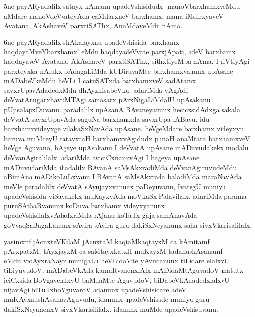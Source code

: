 \begin{artha}
5ne payARyadalilx satayx kAmanu upadeVshisidudx- manoVbarxhamxveMdu aMdare manoVdeVvateyAda caMdarxneV barxhamx, mana iMdirxyaveV Ayatana, AkAshaveV parxtiSAThx, AnaMdaveMdu nAma. 
\end{artha}

\begin{artha}
6ne payARyadalilx shAkalayxnu upadeVshisida barxhamx haqdayaMveYbarxhamx' eMdu haqdayadeVvate parxjApati, adeV barxhamx haqdayaveV Ayatana, AkAshaveV parxtiSAThx, sithxtiyeMba nAma. I riVtiyAgi parxteyxka nAlukx pAdagaLiMda kUDiruvaMte barxhamxvanunx upAsane mADabeVkeMdu heVLi I catuSATxda barxhamxveV sadAtamx savxrUpavAdadedxMdu dhAyxnisabeVku. adariMda vAgAdi deVvatAnugarxhavuMTAgi samasatx pArxNigaLiMdalU upAsakanu pUjisalapxDuvanu. paradalilx upAsanA BAvaneyanunx hecicxsidAdxga sakala deVvatA savxrUpavAda saguNa barxhamxda savxrUpa lABavu. idu barxhamxvideyxge vilakaSxNavAda upAsane. heVgeMdare barxhamx videyxyu baruva muMceyU tatavxtaH barxhamxvAgidudx punaH anaMtara barxhamxveV heVge Aguvano, hAgeye upAsakanu I deVvatA upAsane mADuvudakekx modalu deVvanAgiralilalx. adariMda aviciCxnanxvAgi I bageya upAsane mADuvudariMda ihadalilx BAvanA saMsAkxradiMda deVvanAgiruvudeMdu aBimAna mADikoLuLxvanu I BAvanA saMsAkxrada baladiMda maraNavAda meVle paradalilx deVvatA sAyujayxvanunx paDeyuvanu, IvaregU muniyu upadeVshisida viSayakekx muKayxvAda moVkaSx Palavilalx, adariMda parama puruSAthaRvanunx koDuva barxhamx videyxyanunx upadeVshisilalxvAdadxriMda rAjanu koTaTx gaja samAnavAda goVvaqSaBagaLanunx sAvira sAvira guru dakiSxNeyanunx saha sivxVkarisalilalx. 
\end{artha}%


\begin{artha}
yasimxnf jAcnxteV\s KilaM jAcnxtaM kaqtaMkaqtayxM ca kAmitamf \\
pArxpatxM, tAyxjayxM ca saMtayxkatxH muKayxM tadanushAsanamf \\ 

eMdu vidAyxraNayx munigaLu heVLidaMte yAvudanunx tiLidare elalxvU tiLiyuvudoV, mADabeVkAda kamaRvanenxlAlx mADidaMtAguvadoV matutx iciCxsida BoVgavelalxvU baMdaMte AguvudoV, biDabeVkAdadedxlalxvU nijavAgi biTuTxhoVguvaroV adanunx upadeVshisidare adeV muKAyxnushAsanavAguvudu, idanunx upadeVshisade muniyu guru dakiSxNeyanenxV sivxVkarisililalx. idanunx muMde upadeVshisuvanu. 
\end{artha}

